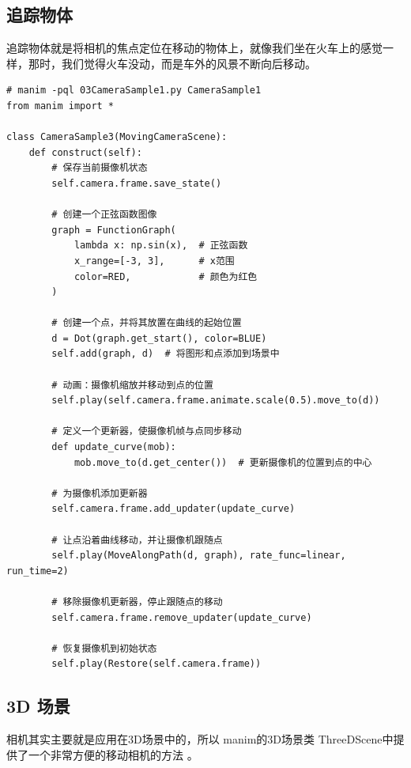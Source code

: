 \subsection{追踪物体}
\label{subsec:manim_animation_camera_track}
追踪物体就是将相机的焦点定位在移动的物体上，就像我们坐在火车上的感觉一样，那时，我们觉得火车没动，而是车外的风景不断向后移动。

\begin{lstlisting}[style=pythonstyle]
# manim -pql 03CameraSample1.py CameraSample1  
from manim import *

class CameraSample3(MovingCameraScene):
    def construct(self):
        # 保存当前摄像机状态
        self.camera.frame.save_state()

        # 创建一个正弦函数图像
        graph = FunctionGraph(
            lambda x: np.sin(x),  # 正弦函数
            x_range=[-3, 3],      # x范围
            color=RED,            # 颜色为红色
        )

        # 创建一个点，并将其放置在曲线的起始位置
        d = Dot(graph.get_start(), color=BLUE)
        self.add(graph, d)  # 将图形和点添加到场景中

        # 动画：摄像机缩放并移动到点的位置
        self.play(self.camera.frame.animate.scale(0.5).move_to(d))

        # 定义一个更新器，使摄像机帧与点同步移动
        def update_curve(mob):
            mob.move_to(d.get_center())  # 更新摄像机的位置到点的中心

        # 为摄像机添加更新器
        self.camera.frame.add_updater(update_curve)

        # 让点沿着曲线移动，并让摄像机跟随点
        self.play(MoveAlongPath(d, graph), rate_func=linear, run_time=2)

        # 移除摄像机更新器，停止跟随点的移动
        self.camera.frame.remove_updater(update_curve)

        # 恢复摄像机到初始状态
        self.play(Restore(self.camera.frame))
\end{lstlisting}

\subsection{3D 场景}
\label{subsec:manim_animation_camera_3d}
相机其实主要就是应用在3D场景中的，所以 manim的3D场景类 ThreeDScene中提供了一个非常方便的移动相机的方法 。

